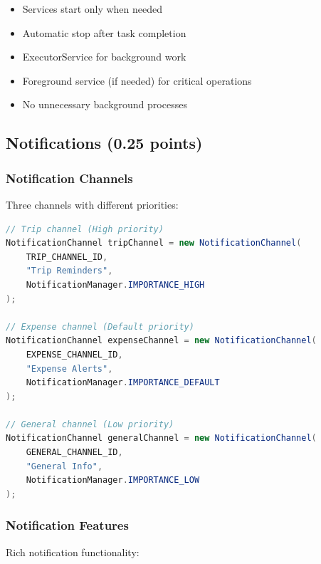 \documentclass[12pt,a4paper]{article}
\begin{document}
\begin{itemize}
    \item Services start only when needed
    \item Automatic stop after task completion
    \item ExecutorService for background work
    \item Foreground service (if needed) for critical operations
    \item No unnecessary background processes
\end{itemize}

\subsection{Notifications (0.25 points)}

\subsubsection{Notification Channels}
Three channels with different priorities:

\begin{lstlisting}[language=Java, caption=Notification Channels]
// Trip channel (High priority)
NotificationChannel tripChannel = new NotificationChannel(
    TRIP_CHANNEL_ID,
    "Trip Reminders",
    NotificationManager.IMPORTANCE_HIGH
);

// Expense channel (Default priority)
NotificationChannel expenseChannel = new NotificationChannel(
    EXPENSE_CHANNEL_ID,
    "Expense Alerts",
    NotificationManager.IMPORTANCE_DEFAULT
);

// General channel (Low priority)
NotificationChannel generalChannel = new NotificationChannel(
    GENERAL_CHANNEL_ID,
    "General Info",
    NotificationManager.IMPORTANCE_LOW
);
\end{lstlisting}

\subsubsection{Notification Features}
Rich notification functionality:
\end{document}
